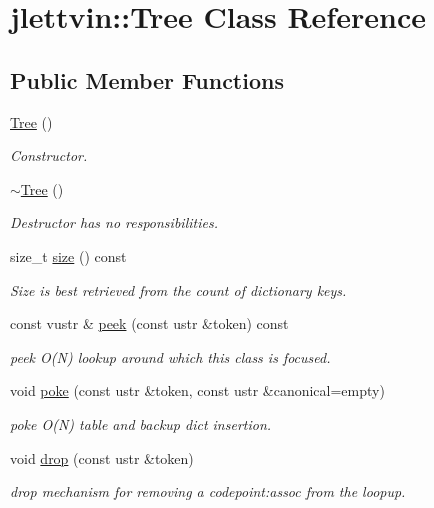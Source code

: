 \hypertarget{classjlettvin_1_1_tree}{}\section{jlettvin\+:\+:Tree Class Reference}
\label{classjlettvin_1_1_tree}
\subsection*{Public Member Functions}
\begin{DoxyCompactItemize}
\item 
\hyperlink{classjlettvin_1_1_tree_ad376a7c639d857312f5de2ef47482f68}{Tree} ()
\begin{DoxyCompactList}\small\item\em Constructor. \end{DoxyCompactList}\item 
\hyperlink{classjlettvin_1_1_tree_abdc38545cf3f588725b5d8b8075b3866}{$\sim$\+Tree} ()
\begin{DoxyCompactList}\small\item\em Destructor has no responsibilities. \end{DoxyCompactList}\item 
size\+\_\+t \hyperlink{classjlettvin_1_1_tree_a1edf6251d8a3aa6a3a40d261339b83c6}{size} () const 
\begin{DoxyCompactList}\small\item\em Size is best retrieved from the count of dictionary keys. \end{DoxyCompactList}\item 
const vustr \& \hyperlink{classjlettvin_1_1_tree_ade38eb49629974e278de81cbc40a4528}{peek} (const ustr \&token) const 
\begin{DoxyCompactList}\small\item\em peek O(\+N) lookup around which this class is focused. \end{DoxyCompactList}\item 
void \hyperlink{classjlettvin_1_1_tree_a9449aa28ef4a7cafde2134206ba2a238}{poke} (const ustr \&token, const ustr \&canonical=empty)
\begin{DoxyCompactList}\small\item\em poke O(\+N) table and backup dict insertion. \end{DoxyCompactList}\item 
void \hyperlink{classjlettvin_1_1_tree_af6eacfd1dc52c39d9363857ea9aa6ac9}{drop} (const ustr \&token)
\begin{DoxyCompactList}\small\item\em drop mechanism for removing a codepoint\+:assoc from the loopup. \end{DoxyCompactList}\end{DoxyCompactItemize}


